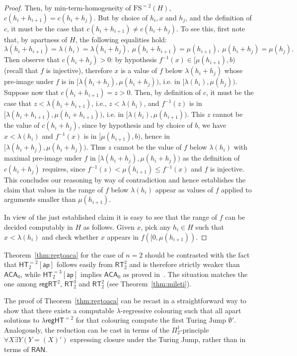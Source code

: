\documentclass[a4paper,11pt]{article}
\newcommand\ACA{\mathsf{ACA}}
\newcommand\HT{\mathsf{HT}}
\newcommand\RT{\mathsf{RT}}
\newcommand\regHT{\mathsf{regHT}}
\newcommand\REG{\mathsf{regRT}}
\newcommand\FS{\mathrm{FS}}
\newcommand\ap{\mathsf{ap}}
\newcommand\RAN{\mathsf{RAN}}
\begin{document}
\begin{proof}
Then, by min-term-homogeneity of $\FS^{=2}(H)$, $c(h_i + h_{i+1}) = c(h_i + h_j)$. But by choice of $h_i, x$ and $h_j$, 
and the definition of $c$, it must be the case that $c(h_i + h_{i+1}) \neq c(h_i + h_j)$. To see this, first note that, 
by apartness of $H$, the following equalities hold: 
$$\lambda(h_i + h_{i+1}) = \lambda(h_i) = \lambda(h_i+h_j),\ \mu(h_i + h_{i+1}) = \mu(h_{i+1}),\ \mu(h_i + h_j) = \mu(h_j).$$ 
Then observe that
$c(h_i + h_j) > 0$: by hypothesis $f^{-1}(x) \in [\mu(h_{i+1}), b)$ (recall that $f$ is injective), therefore $x$ is a value of $f$ below $\lambda(h_i+h_j)$ whose pre-image under $f$ is in $[\lambda(h_i+h_j),\mu(h_i+h_j))$, i.e.
in $[\lambda(h_i),\mu(h_j))$. Suppose now that $c(h_i + h_{i+1}) = z > 0$. Then, by definition of
$c$, it must be the case that $z < \lambda(h_i + h_{i+1})$, i.e., $z < \lambda(h_i)$, and $f^{-1}(z)$ is in 
$[\lambda(h_i+h_{i+1}), \mu(h_i+h_{i+1}))$, 
i.e. in $[\lambda(h_i), \mu(h_{i+1}))$. This $z$ cannot be the value of $c(h_i + h_j)$, since 
by hypothesis and by choice of $b$, we have $x < \lambda(h_i)$ and $f^{-1}(x)$ is in $[\mu(h_{i+1}), b)$, 
hence in $[\lambda(h_i+h_j), \mu(h_i+h_j))$. Thus $z$ cannot be the value of $f$ below $\lambda(h_i)$
with maximal pre-image under $f$ in $[\lambda(h_i+h_j),\mu(h_i+h_j))$ as the definition of $c(h_i+h_j)$ requires, 
since $f^{-1}(z) < \mu(h_{i+1}) \leq f^{-1}(x)$ and $f$ is injective. This concludes our reasoning by way of contradiction 
and hence establishes the claim that values in the range of $f$ below $\lambda(h_i)$ appear as values of $f$ applied to 
arguments smaller than $\mu(h_{i+1})$.

In view of the just established claim it is easy to see that the range of $f$ can be decided computably in $H$ as follows. Given $x$, pick any $h_i \in H$ such that 
$x < \lambda(h_i)$ and check whether $x$ appears in $f([0, \mu(h_{i+1}))$. 
\end{proof}

Theorem~\ref{thm:regtoaca} for the case of $n=2$ should be contrasted with the fact that $\HT^{=2}_2[\ap]$ follows easily from $\RT^2_2$ and is therefore strictly weaker than $\ACA_0$, while
$\HT^{=3}_2[\ap]$ implies $\ACA_0$ as proved in~\cite{Car-Kol-Lep-Zda:20}. 
The situation matches the one among $\REG^2$, $\RT^3_2$ and $\RT^2_2$ (see Theorem~\ref{thm:mileti}). 

The proof of Theorem~\ref{thm:regtoaca} can be recast in a straightforward way to show that there exists 
a computable $\lambda$-regressive colouring such that all apart solutions to $\lambda\regHT^{=2}$ for that colouring
compute the first Turing Jump $\emptyset'$. Analogously, the reduction can be cast in terms of the $\Pi^1_2$-principle
$\forall X \exists Y ( Y = (X)')$ expressing closure under the Turing Jump, rather than in terms of $\RAN$. 
\end{document}
